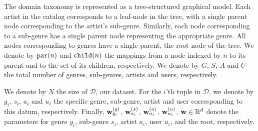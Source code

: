 The  domain taxonomy is represented as a tree-structured graphical model. Each artist in the catalog corresponds to a leaf-node in the tree, with a single parent node corresponding to the artist's sub-genre. Similarly, each node corresponding to a sub-genre has a single parent node representing the appropriate genre. All nodes corresponding to genres  have a single parent, the root node of the tree. We denote by $\texttt{par}(n)$ and $\texttt{child}(n)$ the mappings from a node indexed by $n$ to its parent and to the set of its children, respectively. We denote by $G$, $S$, $A$ and $U$ the total number of genres, sub-genres, artists and users, respectively. 

We denote by $N$ the size of $\mathcal{D}$, our dataset.
For the $i$'th tuple in $\mathcal{D}$, we denote by $g_i$, $s_i$, $a_i$ and $u_i$ the specific genre, sub-genre, artist and user corresponding to this datum, respectively.
Finally, $\mathbf{w}^{(g)}_{g_i}$, $\mathbf{w}^{(s)}_{s_i}$, $\mathbf{w}^{(a)}_{a_i}$, $\mathbf{w}^{(u)}_{u_i}$,
$\mathbf{w} \in\mathbb{R}^d$ denote the parameters for genre $g_i$, sub-genre $s_i$, artist $a_i$, user $u_i$, and the root, respectively.

